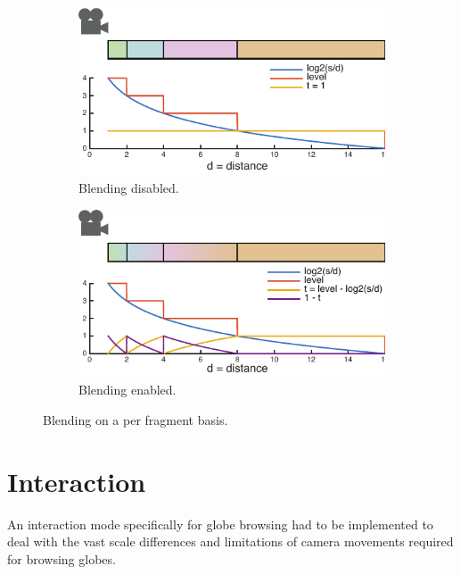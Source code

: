 \begin{figure}[htbp]
    \centering
    \begin{subfigure}[tb]{0.49\textwidth}
    	\includegraphics[width=\textwidth]{figures/implementation/rendering/blending1.pdf}
	\caption{Blending disabled.}
    \end{subfigure}
    \begin{subfigure}[tb]{0.49\textwidth}
    	\includegraphics[width=\textwidth]{figures/implementation/rendering/blending2.pdf}
	\caption{Blending enabled.}
    \end{subfigure}
    \caption{Blending on a per fragment basis.}
    \label{fig:blending}
\end{figure}

\section{Interaction}

An interaction mode specifically for globe browsing had to be implemented to deal with the vast scale differences and limitations of camera movements required for browsing globes. 

